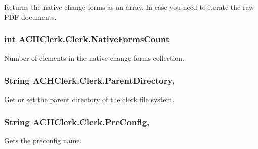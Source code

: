 Returns the native change forms as an array. In case you need to iterate the raw P\+D\+F documents. 

\hypertarget{class_a_c_h_clerk_1_1_clerk_a1c410f7a2fb912b3e62873b5da40323a}{
\subsubsection[{Native\+Forms\+Count}]{\setlength{\rightskip}{0pt plus 5cm}int A\+C\+H\+Clerk.\+Clerk.\+Native\+Forms\+Count\hspace{0.3cm}{\ttfamily [get]}}}\label{class_a_c_h_clerk_1_1_clerk_a1c410f7a2fb912b3e62873b5da40323a}


Number of elements in the native change forms collection. 

\hypertarget{class_a_c_h_clerk_1_1_clerk_ac896f8970b723c849fb728bbc4fbdefd}{
\subsubsection[{Parent\+Directory}]{\setlength{\rightskip}{0pt plus 5cm}String A\+C\+H\+Clerk.\+Clerk.\+Parent\+Directory\hspace{0.3cm}{\ttfamily [get]}, {\ttfamily [set]}}}\label{class_a_c_h_clerk_1_1_clerk_ac896f8970b723c849fb728bbc4fbdefd}


Get or set the parent directory of the clerk file system. 

\hypertarget{class_a_c_h_clerk_1_1_clerk_a1a2f218890be1feeb47819743528531b}{
\subsubsection[{Pre\+Config}]{\setlength{\rightskip}{0pt plus 5cm}String A\+C\+H\+Clerk.\+Clerk.\+Pre\+Config\hspace{0.3cm}{\ttfamily [get]}, {\ttfamily [set]}}}\label{class_a_c_h_clerk_1_1_clerk_a1a2f218890be1feeb47819743528531b}


Gets the preconfig name. 

